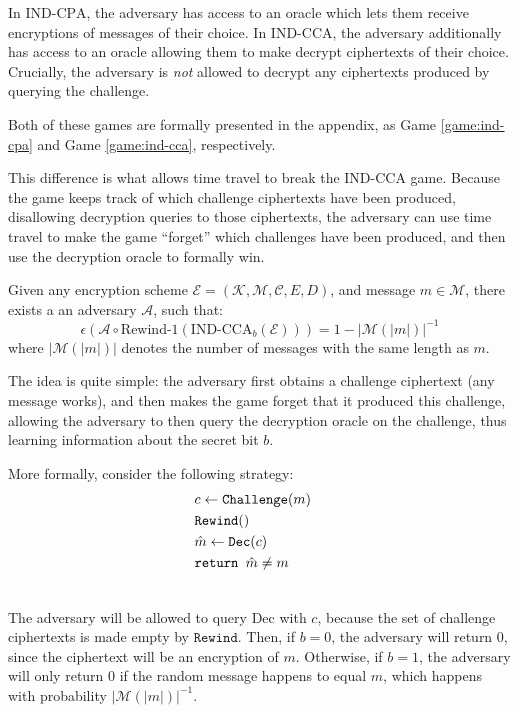 In $\text{IND-CPA}$, the adversary has access to an oracle which lets them
receive encryptions of messages of their choice.
In $\text{IND-CCA}$, the adversary additionally has access to an oracle
allowing them to make decrypt ciphertexts of their choice.
Crucially, the adversary is \emph{not} allowed to decrypt any ciphertexts
produced by querying the challenge.

Both of these games are formally presented in the appendix, as
Game \ref{game:ind-cpa} and Game \ref{game:ind-cca}, respectively.

This difference is what allows time travel to break the
$\text{IND-CCA}$ game.
Because the game keeps track of which challenge ciphertexts have been produced,
disallowing decryption queries to those ciphertexts, the adversary
can use time travel to make the game ``forget'' which challenges have
been produced, and then use the decryption oracle to formally win.

\begin{claim}
\label{claim:ind-cca-broken}
Given any encryption scheme $\mathcal{E} = (\mathcal{K}, \mathcal{M}, \mathcal{C}, E, D)$, and message $m \in \mathcal{M}$, there exists a an adversary
$\mathcal{A}$, such that:
$$
\epsilon(\mathcal{A} \circ \text{Rewind-1}(\text{IND-CCA}_b(\mathcal{E}))) = 1 - |\mathcal{M}(|m|)|^{-1}
$$
where $|\mathcal{M}(|m|)|$ denotes the number of messages with the same length as $m$.
\end{claim}

The idea is quite simple: the adversary first obtains a challenge ciphertext (any message works),
and then makes the game forget that it produced this challenge, allowing the adversary
to then query the decryption oracle on the challenge, thus learning
information about the secret bit $b$.

More formally, consider the following strategy:
$$
\begin{aligned}
&c \gets \texttt{Challenge}(m)\cr
&\texttt{Rewind}()\cr
&\hat{m} \gets \texttt{Dec}(c)\cr
&\texttt{return } \hat{m} \neq m\cr
&
\end{aligned}
$$

The adversary will be allowed to query $\text{Dec}$ with $c$,
because the set of challenge ciphertexts is made empty by $\texttt{Rewind}$.
Then, if $b = 0$, the adversary will return $0$, since the ciphertext
will be an encryption of $m$.
Otherwise, if $b = 1$, the adversary will only return $0$ if the
random message happens to equal $m$, which happens with probability
$|\mathcal{M}(|m|)|^{-1}$.

